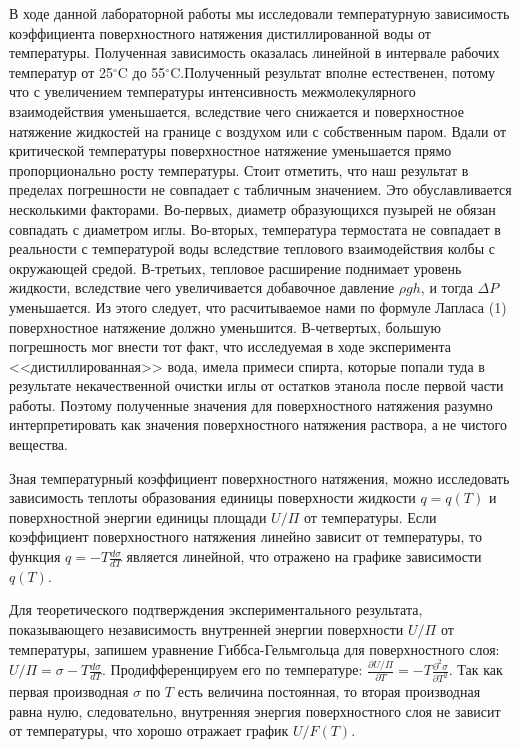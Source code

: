\documentclass[12pt,a4paper]{article}
\begin{document}
\item В ходе данной лабораторной работы мы исследовали температурную зависимость коэффициента поверхностного натяжения дистиллированной воды от температуры. Полученная зависимость оказалась линейной в интервале рабочих температур от 25$^\circ$C до 55$^\circ$C.Полученный результат вполне естественен, потому что с увеличением температуры интенсивность межмолекулярного взаимодействия уменьшается, вследствие чего снижается и поверхностное натяжение жидкостей на границе с воздухом или с собственным паром. Вдали от критической температуры поверхностное натяжение уменьшается прямо пропорционально росту температуры. Стоит отметить, что наш результат в пределах погрешности не  совпадает с табличным значением. Это обуславливается несколькими факторами. Во-первых, диаметр образующихся пузырей не обязан совпадать с диаметром иглы. Во-вторых, температура термостата не совпадает в реальности с температурой воды вследствие теплового взаимодействия колбы с окружающей средой. В-третьих, тепловое расширение поднимает уровень жидкости, вследствие чего увеличивается добавочное давление $\rho gh$, и тогда $\Delta P$ уменьшается. Из этого следует, что расчитываемое нами по формуле Лапласа (1) поверхностное натяжение должно уменьшится. В-четвертых, большую погрешность мог внести тот факт, что исследуемая в ходе эксперимента <<дистиллированная>> вода, имела примеси спирта, которые попали туда в результате некачественной очистки иглы от остатков этанола после первой части работы. Поэтому полученные значения  для поверхностного натяжения  разумно интерпретировать как значения поверхностного натяжения раствора, а не чистого вещества.
\item Зная температурный коэффициент поверхностного натяжения, можно исследовать зависимость теплоты образования единицы поверхности жидкости $q = q(T)$ и поверхностной энергии единицы площади $U/\Pi$ от температуры. Если коэффициент поверхностного натяжения линейно зависит от температуры, то функция $q =-T\frac{d\sigma}{dT}$ является линейной, что отражено на графике зависимости $q(T)$.
\item Для теоретического подтверждения экспериментального результата, показывающего независимость внутренней энергии поверхности $U/\Pi$ от температуры, запишем уравнение Гиббса-Гельмгольца для поверхностного слоя: $U/\Pi = \sigma - T\frac{d\sigma}{dT}$. Продифференцируем его по температуре: $\frac{\partial U/\Pi}{\partial T} = -T \frac{\partial^2 \sigma}{\partial T^2}$. Так как первая производная $\sigma$ по $T$ есть величина постоянная, то вторая производная равна нулю, следовательно, внутренняя энергия поверхностного слоя не зависит от температуры, что хорошо отражает график $U/F (T)$.
\end{document}
